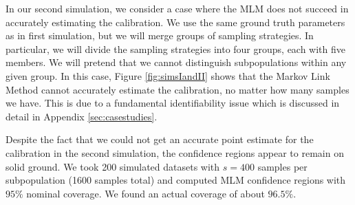 In our second simulation, we consider a case where the MLM does not succeed in accurately estimating the calibration.   We use the same ground truth parameters as in first simulation, but we will merge groups of sampling strategies.  In particular, we will divide the sampling strategies into four groups, each with five members.   We will pretend that we cannot distinguish subpopulations within any given group.  In this case, Figure \ref{fig:simsIandII} shows that the Markov Link Method cannot accurately estimate the calibration, no matter how many samples we have.  This is due to a fundamental identifiability issue which is discussed in detail in Appendix \ref{sec:casestudies}.  

Despite the fact that we could not get an accurate point estimate for the calibration in the second simulation, the confidence regions appear to remain on solid ground.  We took 200 simulated datasets with $s=400$ samples per subpopulation (1600 samples total) and computed MLM confidence regions with $95\%$ nominal coverage. We found an actual coverage of about $96.5\%$.  


